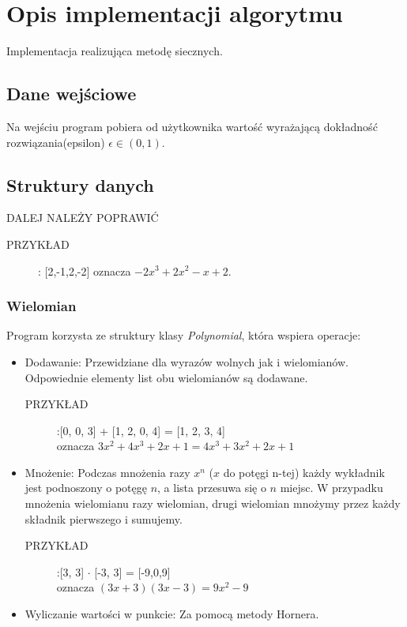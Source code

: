 \documentclass[12pt]{article}
\begin{document}
\section{Opis implementacji algorytmu}
Implementacja realizująca metodę siecznych.
\subsection{Dane wejściowe}
Na wejściu program pobiera od użytkownika wartość wyrażającą dokładność rozwiązania(epsilon) $\epsilon \in(0,1).$ 
\subsection{Struktury danych}
DALEJ NALEŻY POPRAWIĆ
\begin{description}
 
 \item[PRZYKŁAD]:\hspace{5 mm}  [2,-1,2,-2] oznacza $-2x^{3} + 2x^{2} - x + 2$.
 \\
\end{description}
\subsubsection{Wielomian}Program korzysta ze struktury klasy \emph{Polynomial}, która wspiera operacje:
\begin{itemize}
 \item Dodawanie: Przewidziane dla wyrazów wolnych jak i wielomianów. Odpowiednie elementy list obu wielomianów są dodawane.
 \begin{description}
 
 \item[PRZYKŁAD]:\hspace{5 mm}[0, 0, 3] + [1, 2, 0, 4] = [1, 2, 3, 4] \\ oznacza 
  $3x^2 + 4x^{3}+2x+1 = 4x^{3}+3x^{2}+2x+1 $
   \end{description}
 \item Mnożenie: Podczas mnożenia razy $x^{n}$ ($x$ do potęgi n-tej) każdy wykładnik jest podnoszony o potęgę $n$, a lista przesuwa się o $n$ miejsc. W przypadku mnożenia wielomianu razy wielomian, drugi wielomian mnożymy przez każdy składnik pierwszego i sumujemy.
 \begin{description}
 
\item[PRZYKŁAD]:\hspace{5 mm}[3, 3] $\cdot$ [-3, 3] = [-9,0,9] \\ oznacza $(3x + 3)(3x - 3) = 9x^{2} - 9$
 \end{description}
 \item Wyliczanie wartości w punkcie: Za pomocą metody Hornera.
\end{itemize}
\end{document}
